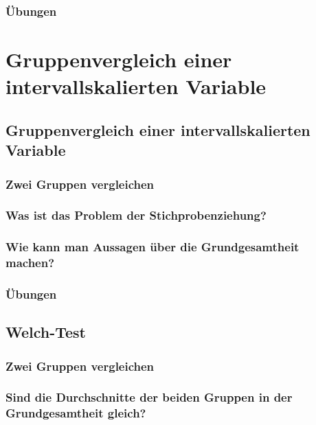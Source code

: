 \documentclass[
]{book}
\theoremstyle{definition}
\theoremstyle{definition}
\theoremstyle{definition}
\theoremstyle{definition}
\theoremstyle{remark}
\begin{document}
\section{Übungen}\label{uxfcbungen-2}

\part{Gruppenvergleich einer intervallskalierten Variable}\label{part-gruppenvergleich-einer-intervallskalierten-variable}

\chapter{Gruppenvergleich einer intervallskalierten Variable}\label{gruppenvergleich-einer-intervallskalierten-variable}

\section{Zwei Gruppen vergleichen}\label{zwei-gruppen-vergleichen}

\section{Was ist das Problem der Stichprobenziehung?}\label{was-ist-das-problem-der-stichprobenziehung}

\section{Wie kann man Aussagen über die Grundgesamtheit machen?}\label{wie-kann-man-aussagen-uxfcber-die-grundgesamtheit-machen}

\section{Übungen}\label{uxfcbungen-3}

\chapter{Welch-Test}\label{welch-test}

\section{Zwei Gruppen vergleichen}\label{zwei-gruppen-vergleichen-1}

\section{Sind die Durchschnitte der beiden Gruppen in der Grundgesamtheit gleich?}\label{sind-die-durchschnitte-der-beiden-gruppen-in-der-grundgesamtheit-gleich}
\end{document}

